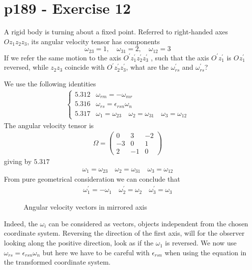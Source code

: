 \section{p189 - Exercise 12}
\begin{tcolorbox}
A rigid body is turning about a fixed point. Referred to right-handed axes $Oz_1z_2z_3$, its angular velocity tensor has components
$$\omega_{23}=1, \quad \omega_{31}=2, \quad\omega_{12}=3$$
If we refer the same motion to the axis  $O^{'}z^{'}_1z^{'}_2z^{'}_3$ , such that the axis $O^{'}z^{'}_1$ is $O^{}z^{'}_1$ reversed, while $z_2z_3$ coincide with $O^{'}z^{'}_2z^{'}_3$, what are the $\omega^{'}_{rs}$ and $\omega^{'}_{rs}$?
\end{tcolorbox}

We use the following identities
\begin{align}
\left\{\begin{array}{ll}
 \mathbf{5.312}& \omega_{rm}=-\omega_{mr}\\
\mathbf{5.316}& \omega_{rs}=\epsilon_{rsn}\omega_{n}\\
\mathbf{5.317}& \omega_{1}= \omega_{23}\quad\omega_{2}= \omega_{31}\quad\omega_{3}= \omega_{12}
\end{array}\right.
\end{align}
The angular velocity tensor is
\begin{align}
\Omega =\left( \begin{matrix}
0&3&-2\\
-3&0&1\\
2&-1&0
\end{matrix}\right)
\end{align}
giving by $\mathbf{5.317}$
\begin{align}
 \omega_{1}= \omega_{23}\quad\omega_{2}= \omega_{31}\quad\omega_{3}= \omega_{12}
 \end{align}
 From pure geometrical consideration we can conclude that
 \begin{align}
 \omega_{1}^{'}= -\omega_{1}^{}\quad\omega_{2}^{'}= \omega_{2}^{}\quad\omega_{3}^{'}= \omega_{3}^{}
 \end{align}
 
\begin{figure}[H]
    \centering
    \subfloat[]{}
\caption{Angular velocity vectors in mirrored axis}
\label{fig:fig_p169_a}
\end{figure}
Indeed, the $\omega_i$ can be considered as vectors, objects independent from the chosen coordinate system. Reversing the direction of the first axis, will for the observer looking along the positive direction, look as if the $\omega_1$ is reversed.
We now use $\omega_{rs}=\epsilon_{rsn}\omega_{n}$ but here we have to be careful with $\epsilon_{rsn}$ when using the equation in the transformed coordinate system.

